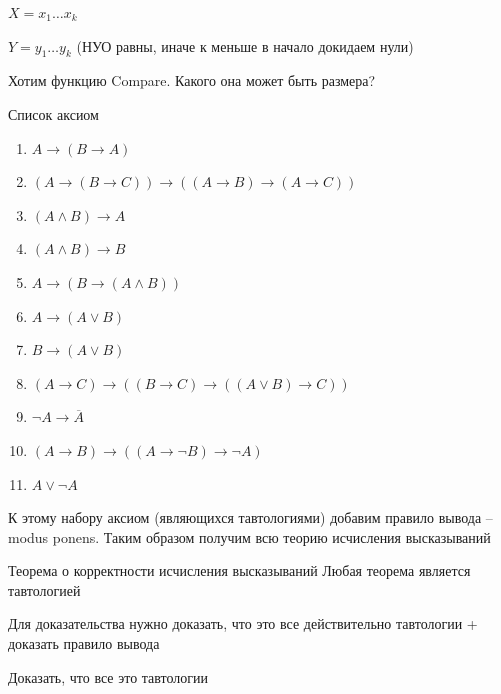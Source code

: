 \documentclass[12pt]{article}
\begin{document}
\begin{nota}{}
    $X = x_1 \ldots x_k$

    $Y = y_1 \ldots y_k$ (НУО равны, иначе к меньше в начало докидаем нули)

    Хотим функцию Compare. Какого она может быть размера?
\end{nota}

\begin{theo}{Список аксиом}
    \begin{enumerate}
        \item $A \to (B \to A)$
        \item $(A \to (B \to C)) \to ((A \to B) \to (A \to C))$
        \item $(A \land B) \to A$
        \item $(A \land B) \to B$
        \item $A \to (B \to (A \land B))$
        \item $A \to (A \lor B)$
        \item $B \to (A \lor B)$
        \item $(A \to C) \to ((B \to C) \to ((A \lor B) \to C))$
        \item $\neg A \to \overline{A}$
        \item $(A \to B) \to ((A \to \neg B) \to \neg A)$
        \item $A \lor \neg A$
    \end{enumerate}
\end{theo}

\begin{Remark}{}
    К этому набору аксиом (являющихся тавтологиями) добавим правило вывода -- modus ponens. Таким образом получим всю теорию исчисления высказываний
\end{Remark}

\begin{theo}{Теорема о корректности исчисления высказываний}
    Любая теорема является тавтологией
\end{theo}

\begin{Proof}{}

Для доказательства нужно доказать, что это все действительно тавтологии + доказать правило вывода

\end{Proof}

\begin{Exercise}{}
    Доказать, что все это тавтологии
\end{Exercise}
\end{document}
